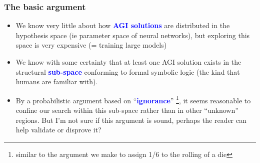 \documentclass[16pt]{beamer}
\let\oldtextbf\textbf
\renewcommand{\textbf}[1]{\textcolor{blue}{\oldtextbf{#1}}}
\begin{document}
\begin{frame}
\frametitle{The basic argument}
\begin{itemize}
	\item We know very little about how \textbf{AGI solutions} are distributed in the hypothesis space (ie parameter space of neural networks), but exploring this space is very expensive (= training large models)
	\item We know with some certainty that at least one AGI solution exists in the structural \textbf{sub-space} conforming to formal symbolic logic (the kind that humans are familiar with).
	\item By a probabilistic argument based on ``\textbf{ignorance}'' \footnote{similar to the argument we make to assign 1/6 to the rolling of a die}, it seems reasonable to confine our search within this sub-space rather than in other ``unknown'' regions.  But I'm not sure if this argument is sound, perhaps the reader can help validate or disprove it?
\end{itemize}
\end{frame}
\end{document}
